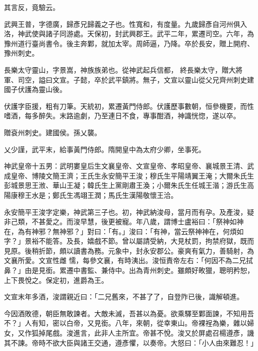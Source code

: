 \begin{pinyinscope}
 其言反，竟驗云。



 武興王普，字德廣，歸彥兄歸義之子也。性寬和，有度量。九歲歸彥自河州俱入洛，神武使與諸子同游處。天保初，封武興郡王。武平二年，累遷司空。六年，為豫州道行臺尚書令。後主奔鄴，就加太宰。周師逼，乃降。卒於長安，贈上開府、豫州刺史。



 長樂太守靈山，字景嵩，神族族弟也。從神武起兵信都，
 終長樂太守，贈大將軍、司空，謚曰文宣。子懿，卒於武平鎮將。無子，文宣以靈山從父兄齊州刺史建國子伏護為靈山後。



 伏護字臣援，粗有刀筆。天統初，累遷黃門侍郎。伏護歷事數朝，恒參機要，而性嗜酒，每多醉失。末路逾劇，乃至連日不食，專事酣酒，神識恍惚，遂以卒。



 贈袞州刺史。建國侯。孫乂襲。



 乂少謹，武平末，給事黃門侍郎。隋開皇中為太府少卿，坐事死。



 神武皇帝十五男：武明婁皇后生文襄皇帝、文宣皇帝、孝昭皇帝、襄城景王清、武成皇帝、博陵文簡王濟；王氏生永安簡平王浚；穆氏生平陽靖翼王淹；大爾朱氏生
 彭城景思王浟、華山王凝；韓氏生上黨剛肅王渙；小爾朱氏生任城王湝；游氏生高陽康穆王水是；鄭氏生馮翊王潤；馬氏生漢陽敬懷王洽。



 永安簡平王浚字定樂，神武第三子也。初，神武納浚母，當月而有孕。及產浚，疑非己類，不甚愛之。而浚早慧，後更被寵。年八歲，謂博士盧裕曰：「祭神如神在，為有神邪？無神邪？」對曰：「有。」浚曰：「有神，當云祭神神在，何煩如字？」景裕不能答。及長，嬉戲不節。曾以屬請受納，大見杖罰，拘禁府獄，既而見原。後稍折節，頗以讀書為務。元象中，封永安郡公。豪爽有氣力，善騎射，為文襄所愛。文宣性雌
 懦，每參文襄，有時洟出。浚恒責帝左右：「何因不為二兄拭鼻？」由是見銜。累遷中書監、兼侍中。出為青州刺史。雖頗好畋獵，聰明矜恕，上下畏悅之。保定初，進爵為王。



 文宣末年多酒，浚謂親近曰：「二兄舊來，不甚了了，自登阼已後，識解頓進。



 今因酒敗德，朝臣無敢諫者。大敵未滅，吾甚以為憂。欲乘驛至鄴面諫，不知用吾不？」人有知，密以白帝，又見銜。八年，來朝，從幸東山。帝裸裎為樂，雜以婦女，又作狐掉尾戲。浚進言，此非人主所宜。帝甚不悅。浚又於屏處召楊遵彥，譏其不諫。帝時不欲大臣與諸王交通，遵彥懼，以奏帝。大怒曰：「小人由來難忍！」




\end{pinyinscope}
